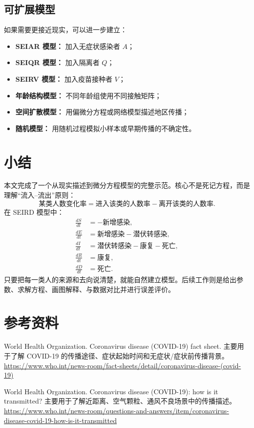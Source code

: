 \documentclass[UTF8,12pt,a4paper]{ctexart}
\begin{document}
\subsection{可扩展模型}
如果需要更接近现实，可以进一步建立：
\begin{itemize}
\item \textbf{SEIAR 模型：} 加入无症状感染者 $A$；
\item \textbf{SEIQR 模型：} 加入隔离者 $Q$；
\item \textbf{SEIRV 模型：} 加入疫苗接种者 $V$；
\item \textbf{年龄结构模型：} 不同年龄组使用不同接触矩阵；
\item \textbf{空间扩散模型：} 用偏微分方程或网络模型描述地区传播；
\item \textbf{随机模型：} 用随机过程模拟小样本或早期传播的不确定性。
\end{itemize}

\section{小结}
本文完成了一个从现实描述到微分方程模型的完整示范。核心不是死记方程，而是理解“流入--流出”原则：
\[
\text{某类人数变化率}=\text{进入该类的人数率}-\text{离开该类的人数率}.
\]
在 SEIRD 模型中：
\begin{align*}
\frac{dS}{dt}&=-\text{新增感染},\\
\frac{dE}{dt}&=\text{新增感染}-\text{潜伏转感染},\\
\frac{dI}{dt}&=\text{潜伏转感染}-\text{康复}-\text{死亡},\\
\frac{dR}{dt}&=\text{康复},\\
\frac{dD}{dt}&=\text{死亡}.
\end{align*}
只要把每一类人的来源和去向说清楚，就能自然建立模型。后续工作则是给出参数、求解方程、画图解释、与数据对比并进行误差评价。

\newpage

\section*{参考资料}
\small
\sloppy
\noindent [1] World Health Organization. Coronavirus disease (COVID-19) fact sheet. 主要用于了解 COVID-19 的传播途径、症状起始时间和无症状/症状前传播背景。\url{https://www.who.int/news-room/fact-sheets/detail/coronavirus-disease-(covid-19)}

\noindent [2] World Health Organization. Coronavirus disease (COVID-19): how is it transmitted? 主要用于了解近距离、空气颗粒、通风不良场景中的传播描述。\url{https://www.who.int/news-room/questions-and-answers/item/coronavirus-disease-covid-19-how-is-it-transmitted}
\end{document}
